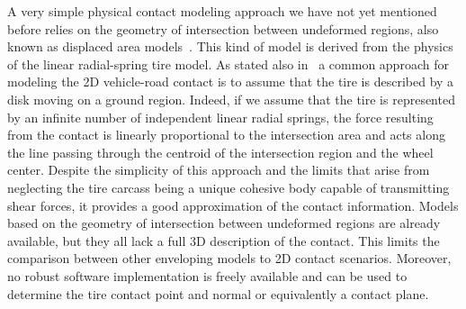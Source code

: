 A very simple physical contact modeling approach we have not yet mentioned before relies on the geometry of intersection between undeformed regions, also known as displaced area models~\cite{mousseau2003obstacle}. This kind of model is derived from the physics of the linear radial-spring tire model. As stated also in~\cite{davis1975radial} a common approach for modeling the 2D vehicle-road contact is to assume that the tire is described by a disk moving on a ground region. Indeed, if we assume that the tire is represented by an infinite number of independent linear radial springs, the force resulting from the contact is linearly proportional to the intersection area and acts along the line passing through the centroid of the intersection region and the wheel center. Despite the simplicity of this approach and the limits that arise from neglecting the tire carcass being a unique cohesive body capable of transmitting shear forces, it provides a good approximation of the contact information. Models based on the geometry of intersection between undeformed regions are already available, but they all lack a full 3D description of the contact. This limits the comparison between other enveloping models to 2D contact scenarios. Moreover, no robust software implementation is freely available and can be used to determine the tire contact point and normal or equivalently a contact plane.

